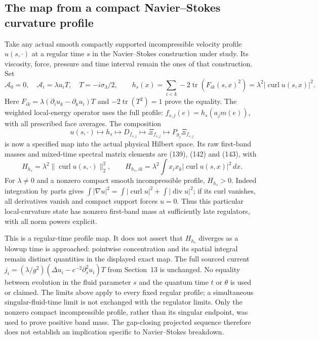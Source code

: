 \documentclass[11pt]{article}
\begin{document}
\subsection{The map from a compact Navier--Stokes curvature profile}

Take any actual smooth compactly supported incompressible velocity
profile $u(s,\cdot)$ at a regular time $s$ in the Navier--Stokes
construction under study. Its viscosity, force, pressure and time
interval remain the ones of that construction. Set
\[
 \mathcal A_0=0,\quad\mathcal A_i=\lambda u_iT,\quad
 T=-i\sigma_3/2,\qquad
 h_s(x)=\sum_{i<k}-2\operatorname{tr}(F_{ik}(s,x)^2)
                =\lambda^2|\operatorname{curl}u(s,x)|^2.
\]
Here $F_{ik}=\lambda(\partial_iu_k-\partial_ku_i)T$ and
$-2\operatorname{tr}(T^2)=1$ prove the equality.
The weighted local-energy operator uses the full profile:
$f_{s,j}(e)=h_s(a_jm(e))$, with all prescribed face averages.
The composition
\[
 u(s,\cdot)\longmapsto h_s\longmapsto D_{f_{s,j}}
 \longmapsto\Xi_{f_{s,j}}\longmapsto P_{g_j}\Xi_{f_{s,j}}
\]
is now a specified map into the actual physical Hilbert space.
Its raw first-band masses and mixed-time spectral matrix elements
are (139), (142) and
(143), with
\[
 H_{h_s}=\lambda^2\|\operatorname{curl}u(s,\cdot)\|_2^2,
 \qquad
 H_{h_s,ik}=\lambda^2\int x_ix_k|\operatorname{curl}u(s,x)|^2\,dx.
\]
For $\lambda\ne0$ and a nonzero compact smooth incompressible profile,
$H_{h_s}>0$. Indeed integration by parts gives
$\int|\nabla u|^2=\int|\operatorname{curl}u|^2+
\int|\operatorname{div}u|^2$; if its curl vanishes, all derivatives
vanish and compact support forces $u=0$.
Thus this particular local-curvature state has nonzero first-band
mass at sufficiently late regulators, with all norm powers explicit.

This is a regular-time profile map. It does not assert that
$H_{h_s}$ diverges as a blowup time is approached: pointwise
concentration and its spatial integral remain distinct quantities
in the displayed exact map. The full sourced current
$j_i=(\lambda/g^2)(\Delta u_i-c^{-2}\partial_s^2u_i)T$
from Section~13 is unchanged. No equality between evolution in
the fluid parameter $s$ and the quantum time $t$ or $\theta$ is
used or claimed. The limits above apply to every fixed regular
profile; a simultaneous singular-fluid-time limit is not exchanged
with the regulator limits.
Only the nonzero compact incompressible profile, rather than its
singular endpoint, was used to prove positive band mass. The
gap-closing projected sequence therefore does not establish an
implication specific to Navier--Stokes breakdown.
\end{document}
